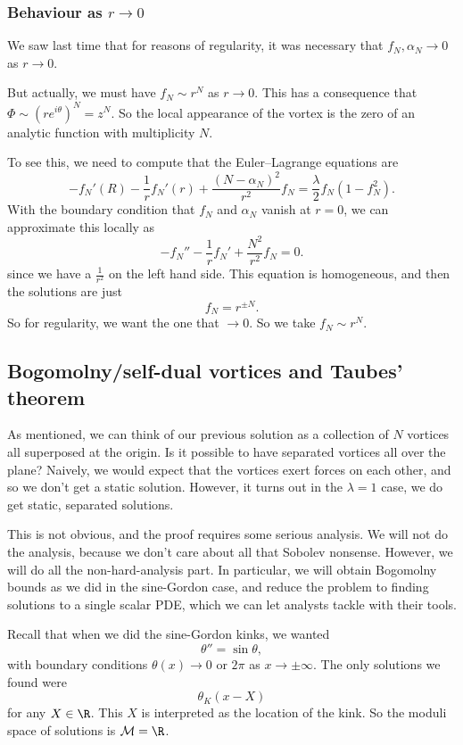 \documentclass[a4paper]{article}
\begin{document}
\subsubsection*{Behaviour as $r \to 0$}
We saw last time that for reasons of regularity, it was necessary that $f_N, \alpha_N \to 0$ as $r \to 0$.

But actually, we must have $f_N \sim r^N$ as $r \to 0$. This has a consequence that $\Phi \sim (r e^{i\theta})^N = z^N$. So the local appearance of the vortex is the zero of an analytic function with multiplicity $N$.

To see this, we need to compute that the Euler--Lagrange equations are
\[
  -f_N'(R) - \frac{1}{r} f_N'(r) + \frac{(N - \alpha_N)^2}{r^2} f_N = \frac{\lambda}{2} f_N(1 - f_N^2).
\]
With the boundary condition that $f_N$ and $\alpha_N$ vanish at $r = 0$, we can approximate this locally as
\[
  - f_N'' - \frac{1}{r} f_N' + \frac{N^2}{r^2} f_N = 0.
\]
since we have a $\frac{1}{r^2}$ on the left hand side. This equation is homogeneous, and then the solutions are just
\[
  f_N = r^{\pm N}.
\]
So for regularity, we want the one that $\to 0$. So we take $f_N \sim r^N$.

\subsection{Bogomolny/self-dual vortices and Taubes' theorem}
As mentioned, we can think of our previous solution as a collection of $N$ vortices all superposed at the origin. Is it possible to have separated vortices all over the plane? Naively, we would expect that the vortices exert forces on each other, and so we don't get a static solution. However, it turns out in the $\lambda = 1$ case, we do get static, separated solutions.

This is not obvious, and the proof requires some serious analysis. We will not do the analysis, because we don't care about all that Sobolev nonsense. However, we will do all the non-hard-analysis part. In particular, we will obtain Bogomolny bounds as we did in the sine-Gordon case, and reduce the problem to finding solutions to a single scalar PDE, which we can let analysts tackle with their tools.

Recall that when we did the sine-Gordon kinks, we wanted
\[
  \theta'' = \sin \theta,
\]
with boundary conditions $\theta(x) \to 0$ or $2\pi$ as $x \to \pm \infty$. The only solutions we found were
\[
  \theta_K (x - X)
\]
for any $X \in \R$. This $X$ is interpreted as the location of the kink. So the moduli space of solutions is $\mathcal{M} = \R$.
\end{document}
